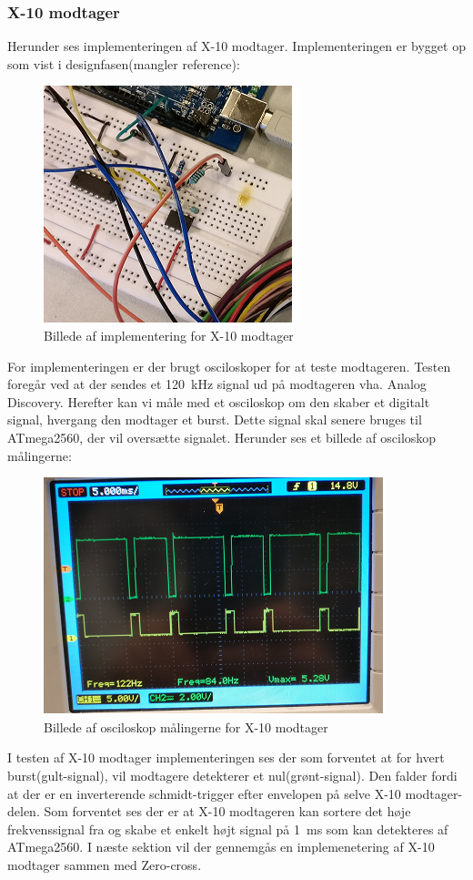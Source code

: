 \documentclass[11pt]{article}
\begin{document}
\subsubsection{X-10 modtager}
Herunder ses implementeringen af X-10 modtager. Implementeringen er bygget op som vist i designfasen(mangler reference):
\begin{figure}[H]
	\centering
	\includegraphics[scale = 1]{X-10modtager-imp}	
	\caption{Billede af implementering for X-10 modtager}
	\label{fig:impX10mod}
\end{figure}
For implementeringen er der brugt osciloskoper for at teste modtageren. Testen foregår ved at der sendes et \SI{120}{\kilo\hertz} signal ud på modtageren vha. Analog Discovery. Herefter kan vi måle med et osciloskop om den skaber et digitalt signal, hvergang den modtager et burst. Dette signal skal senere bruges til ATmega2560, der vil oversætte signalet. Herunder ses et billede af osciloskop målingerne:
\begin{figure}[H]
	\centering
	\includegraphics[scale = 1]{X-10modtager-osc}		
	\caption{Billede af osciloskop målingerne for X-10 modtager}
	\label{bil:oscmodtager}
\end{figure}
I testen af X-10 modtager implementeringen ses der som forventet at for hvert burst(gult-signal), vil modtagere detekterer et nul(grønt-signal). Den falder fordi at der er en inverterende schmidt-trigger efter envelopen på selve X-10 modtager-delen. Som forventet ses der er at X-10 modtageren kan sortere det høje frekvenssignal fra og skabe et enkelt højt signal på \SI{1}{\milli\second} som kan detekteres af ATmega2560. I næste sektion vil der gennemgås en implemenetering af X-10 modtager sammen med Zero-cross.
\end{document}

